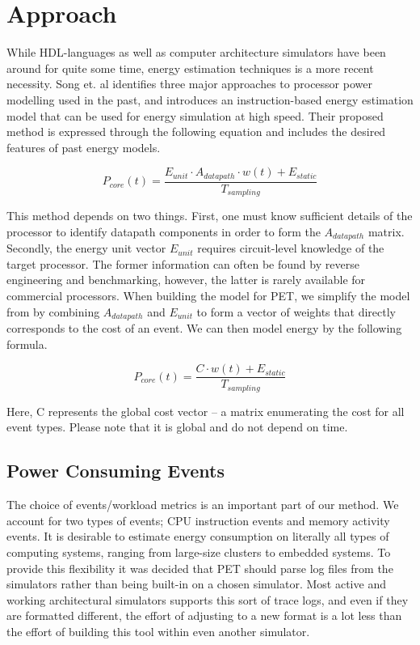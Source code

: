 \section{Approach}

While HDL-languages as well as computer architecture simulators have been around
for quite some time, energy estimation techniques is a more recent necessity.
Song et. al \cite{song2012instruction} identifies three major approaches to
processor power modelling used in the past, and introduces an instruction-based
energy estimation model that can be used for energy simulation at high speed.
Their proposed method is expressed through the following equation and includes
the desired features of past energy models.

\[
    P_{core}(t) = \frac{E_{unit} \cdot A_{datapath} \cdot w(t) +
    E_{static}}{T_{sampling}}
\]

This method depends on two things. First, one must know sufficient details of
the processor to identify datapath components in order to form the
$A_{datapath}$ matrix. Secondly, the energy unit vector $E_{unit}$ requires
circuit-level knowledge of the target processor. The former information can
often be found by reverse engineering and benchmarking, however, the latter is
rarely available for commercial processors. When building the model for PET, we
simplify the model from \cite{song2012instruction} by combining $A_{datapath}$
and $E_{unit}$ to form a vector of weights that directly corresponds to the cost
of an event. We can then model energy by the following formula.

\[
    P_{core}(t) = \frac{C \cdot w(t) + E_{static}}{T_{sampling}}
\]

Here, C represents the global cost vector -- a matrix enumerating the cost
for all event types. Please note that it is global and do not depend on time.

\subsection{Power Consuming Events}
\label{subsec:powerevents}

The choice of events/workload metrics is an important part of our method. We
account for two types of events; CPU instruction events and memory activity
events. It is desirable to estimate energy consumption on literally all types of
computing systems, ranging from large-size clusters to embedded systems. To
provide this flexibility it was decided that PET should parse log files from the
simulators rather than being built-in on a chosen simulator.  Most active and
working architectural simulators supports this sort of trace logs, and even if
they are formatted different, the effort of adjusting to a new format is a lot
less than the effort of building this tool within even another simulator.

